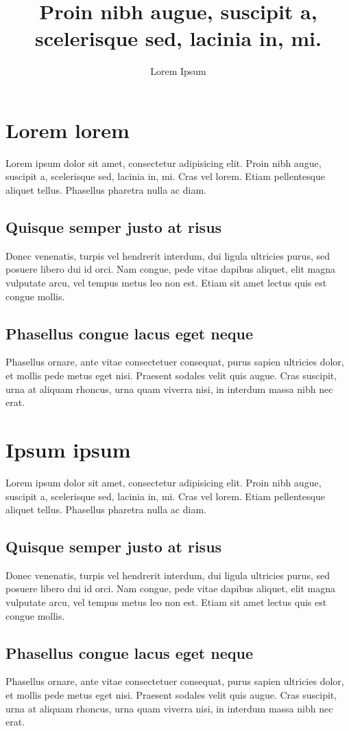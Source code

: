 \documentclass[a4paper,12pt]{wmiibook}
\author{Lorem Ipsum}
\title{Proin nibh augue, suscipit a, scelerisque sed, lacinia in, mi.}
\begin{document}
\maketitle

\chapter{Lorem lorem}
Lorem ipsum dolor sit amet, consectetur adipisicing elit. 
Proin nibh augue, suscipit a, scelerisque sed, lacinia in, mi. 
Cras vel lorem. Etiam pellentesque aliquet tellus. 
Phasellus pharetra nulla ac diam. 

\section{Quisque semper justo at risus}
Donec venenatis, turpis vel hendrerit interdum, dui ligula ultricies purus, 
sed posuere libero dui id orci. 
Nam congue, pede vitae dapibus aliquet, elit magna vulputate arcu, 
vel tempus metus leo non est. 
Etiam sit amet lectus quis est congue mollis. 

\section{Phasellus congue lacus eget neque}
Phasellus ornare, ante vitae consectetuer consequat, 
purus sapien ultricies dolor, et mollis pede metus eget nisi. 
Praesent sodales velit quis augue. Cras suscipit, urna at aliquam rhoncus, 
urna quam viverra nisi, in interdum massa nibh nec erat.

\chapter{Ipsum ipsum}
Lorem ipsum dolor sit amet, consectetur adipisicing elit. 
Proin nibh augue, suscipit a, scelerisque sed, lacinia in, mi. 
Cras vel lorem. Etiam pellentesque aliquet tellus. 
Phasellus pharetra nulla ac diam. 

\section{Quisque semper justo at risus}
Donec venenatis, turpis vel hendrerit interdum, dui ligula ultricies purus, 
sed posuere libero dui id orci. 
Nam congue, pede vitae dapibus aliquet, elit magna vulputate arcu, 
vel tempus metus leo non est. 
Etiam sit amet lectus quis est congue mollis.
 
\section{Phasellus congue lacus eget neque}
Phasellus ornare, ante vitae consectetuer consequat, 
purus sapien ultricies dolor, et mollis pede metus eget nisi. 
Praesent sodales velit quis augue. Cras suscipit, urna at aliquam rhoncus, 
urna quam viverra nisi, in interdum massa nibh nec erat.
\end{document}
